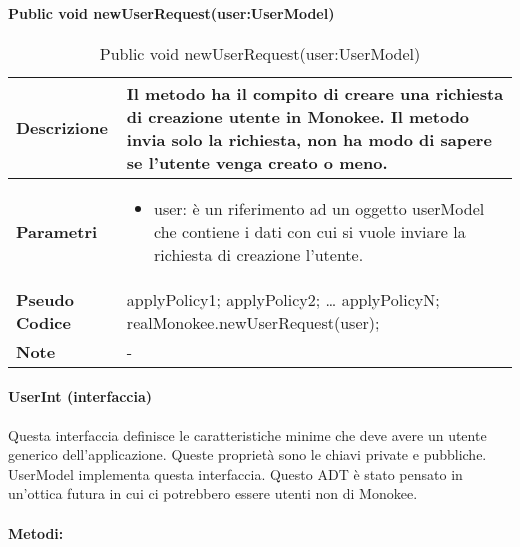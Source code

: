 \paragraph{Public void newUserRequest(user:UserModel)}
\begin{center}
    \begin{longtable}{|p{3cm}|p{9cm}|}%
    \caption{Public void newUserRequest(user:UserModel)}
    \endfirsthead
    \endhead
    \hline
    \textbf{Descrizione} & Il metodo ha il compito di creare una richiesta di creazione utente in Monokee. Il metodo invia solo la richiesta, non ha modo di sapere se l’utente venga creato o meno.\\
    \hline
    \textbf{Parametri} &      
    \begin{itemize}
        \item user: è un riferimento ad un oggetto userModel che contiene i dati con cui si vuole inviare la richiesta di creazione l’utente.
    \end{itemize}
    \\
    \hline
    \textbf{Pseudo Codice} & 
    applyPolicy1;\newline
    applyPolicy2;\newline
    …\newline
    applyPolicyN;\newline
    realMonokee.newUserRequest(user);\newline
    \\
    \hline
    \textbf{Note} & 
    -
    \\
    \hline
    \end{longtable}
    \end{center}



\paragraph{UserInt (interfaccia)}
Questa interfaccia definisce le caratteristiche minime che deve avere un utente generico dell’applicazione. Queste proprietà sono le chiavi private e pubbliche. UserModel implementa questa interfaccia. Questo ADT è stato pensato in un’ottica futura in cui ci potrebbero essere utenti non di Monokee.

\paragraph{Metodi:}
